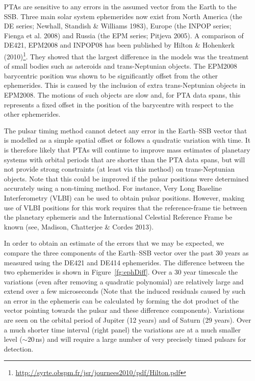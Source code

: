 \documentclass{raa}            %
\begin{document}
PTAs are sensitive to any errors in the assumed vector from the Earth to the SSB. Three main solar system ephemerides now exist from North America (the DE series; Newhall, Standish \& Williams 1983\nocite{nsw83}), Europe (the INPOP series; Fienga et al. 2008\nocite{fmlg08}) and Russia (the EPM series; Pitjeva 2005\nocite{pit05}).  A comparison of DE421, EPM2008 and INPOP08 has been published by Hilton \& Hohenkerk (2010)\footnote{\url{http://syrte.obspm.fr/jsr/journees2010/pdf/Hilton.pdf}}.  They showed that the largest difference in the models was the treatment of small bodies such as asteroids and trans-Neptunian objects.   The EPM2008 barycentric position was shown to be significantly offset from the other ephemerides. This is caused by the inclusion of extra trans-Neptunian objects in EPM2008.  The motions of such objects are slow and, for PTA data spans, this represents a fixed offset in the position of the barycentre with respect to the other ephemerides.

The pulsar timing method cannot detect any error in the Earth--SSB vector that is modelled as a simple spatial offset or follows a quadratic variation with time.  It is therefore likely that PTAs will continue to improve mass estimates of planetary systems with orbital periods that are shorter than the PTA data spans, but will not provide strong constraints (at least via this method) on trans-Neptunian objects.  Note that this could be improved if the pulsar positions were determined accurately using a non-timing method.  For instance, Very Long Baseline Interferometry (VLBI) can be used to obtain pulsar positions.  However, making use of VLBI positions for this work requires that the reference-frame tie between the planetary ephemeris and the International Celestial Reference Frame be known (see, Madison, Chatterjee \& Cordes 2013).

In order to obtain an estimate of the errors that we may be expected, we compare the three components of the Earth--SSB vector over the past 30 years as measured using the DE421 and DE414 ephemerides.   The difference between the two ephemerides is shown in Figure~\ref{fg:ephDiff}.  Over a 30 year timescale the variations (even after removing a quadratic polynomial) are relatively large and extend over a few microseconds (Note that the induced residuals caused by such an error in the ephemeris can be calculated by forming the dot product of the vector pointing towards the pulsar and these difference components). Variations are seen on the orbital period of Jupiter (12 years) and of Saturn (29 years).  Over a much shorter time interval (right panel) the variations are at a much smaller level ($\sim 20$\,ns) and will require a large number of very precisely timed pulsars for detection.
\end{document}

